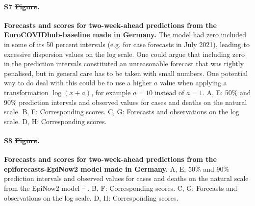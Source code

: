 \documentclass[10pt,letterpaper]{article} %
\providecommand{\DIFaddtex}[1]{{\protect\color{blue}\uwave{#1}}} %
\providecommand{\DIFdeltex}[1]{{\protect\color{red}\sout{#1}}}                      %
\providecommand{\DIFaddbegin}{} %
\providecommand{\DIFaddend}{} %
\providecommand{\DIFdelbegin}{} %
\providecommand{\DIFdelend}{} %
\providecommand{\DIFadd}[1]{\texorpdfstring{\DIFaddtex{#1}}{#1}} %
\providecommand{\DIFdel}[1]{\texorpdfstring{\DIFdeltex{#1}}{}} %
\newcommand{\DIFscaledelfig}{0.5}
\newlength{\DIFdelgraphicswidth} %
\newlength{\DIFdelgraphicsheight} %
\newcommand{\DIFaddincludegraphics}[2][]{{\color{blue}\fbox{\DIFOincludegraphics[#1]{#2}}}} %
\newcommand{\DIFdelincludegraphics}[2][]{%
\sbox{\DIFdelgraphicsbox}{\DIFOincludegraphics[#1]{#2}}%
\settoboxwidth{\DIFdelgraphicswidth}{\DIFdelgraphicsbox} %
\settoboxtotalheight{\DIFdelgraphicsheight}{\DIFdelgraphicsbox} %
\scalebox{\DIFscaledelfig}{%
\parbox[b]{\DIFdelgraphicswidth}{\usebox{\DIFdelgraphicsbox}\\[-\baselineskip] \rule{\DIFdelgraphicswidth}{0em}}\llap{\resizebox{\DIFdelgraphicswidth}{\DIFdelgraphicsheight}{%
\setlength{\unitlength}{\DIFdelgraphicswidth}%
\begin{picture}(1,1)%
\thicklines\linethickness{2pt} %
{\color[rgb]{1,0,0}\put(0,0){\framebox(1,1){}}}%
{\color[rgb]{1,0,0}\put(0,0){\line( 1,1){1}}}%
{\color[rgb]{1,0,0}\put(0,1){\line(1,-1){1}}}%
\end{picture}%
}\hspace*{3pt}}} %
} %
\DeclareRobustCommand{\DIFaddbegin}{\DIFOaddbegin \let\includegraphics\DIFaddincludegraphics} %
\DeclareRobustCommand{\DIFaddend}{\DIFOaddend \let\includegraphics\DIFOincludegraphics} %
\DeclareRobustCommand{\DIFdelbegin}{\DIFOdelbegin \let\includegraphics\DIFdelincludegraphics} %
\DeclareRobustCommand{\DIFdelend}{\DIFOaddend \let\includegraphics\DIFOincludegraphics} %
\begin{document}
\paragraph{S7 \DIFdelbegin \DIFdel{Figure}\DIFdelend \DIFaddbegin \DIFadd{Fig}\DIFaddend .}
\label{fig:HUB-model-comparison-baseline}
\textbf{Forecasts and scores for two-week-ahead predictions from the EuroCOVIDhub-baseline made in Germany. }
The model had zero included in some of its 50 percent intervals (e.g. for case forecasts in July 2021), leading to excessive dispersion values on the log scale. One could argue that including zero in the prediction intervals constituted an unreasonable forecast that was rightly penalised, but in general care has to be taken with small numbers. One potential way to do deal with this could be to use a higher $a$ value when applying a transformation $\log(x + a)$, for example $a = 10$ instead of $a = 1$. A, E: 50\% and 90\% prediction intervals and observed values for cases and deaths on the natural scale. B, F: Corresponding scores. C, G: Forecasts and observations on the log scale. D, H: Corresponding scores. 

\paragraph{S8 \DIFdelbegin \DIFdel{Figure}\DIFdelend \DIFaddbegin \DIFadd{Fig}\DIFaddend .}
\label{fig:HUB-model-comparison-epinow}
\textbf{Forecasts and scores for two-week-ahead predictions from the epiforecasts-EpiNow2 model made in Germany.} 
A, E: 50\% and 90\% prediction intervals and observed values for cases and deaths on the natural scale from the EpiNow2 model \DIFdelbegin \DIFdel{\mbox{%
\citep{epinow2}}\hskip0pt%
}\DIFdelend \DIFaddbegin \DIFadd{\mbox{%
\cite{epinow2}}\hskip0pt%
}\DIFaddend . B, F: Corresponding scores. C, G: Forecasts and observations on the log scale. D, H: Corresponding scores. 


\clearpage
\DIFdelbegin %

\DIFdelend \DIFaddbegin 
 \DIFaddend
\end{document}
